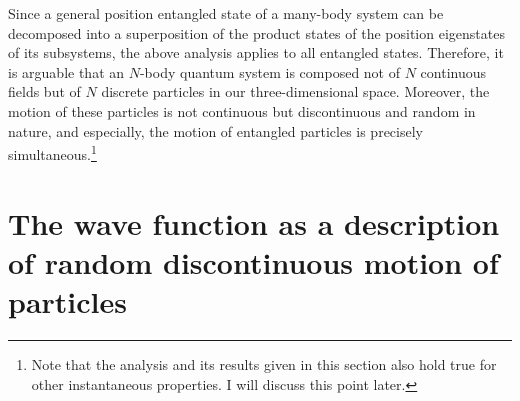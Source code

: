 Since a general position entangled state of a many-body system can be decomposed into a superposition of the product states of the position eigenstates of its subsystems, the above analysis applies to all entangled states.  
Therefore, it is arguable that an $N$-body quantum system is composed not of $N$ continuous fields but of $N$ discrete particles in our three-dimensional space. Moreover, the motion of these particles is not continuous but discontinuous and random in nature, and especially, the motion of entangled particles is precisely simultaneous.\footnote{Note that the analysis and its results given in this section also hold true for other instantaneous properties. I will discuss this point later.} 



\section{The wave function as a description of random discontinuous motion of particles}

